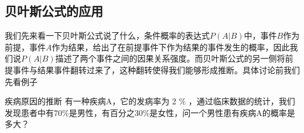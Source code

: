\subsection{贝叶斯公式的应用}
我们先来看一下贝叶斯公式说了什么，条件概率的表达式$P(A|B)$中，事件$B$作为前提，事件$A$作为结果，给出了在前提事件下作为结果的事件发生的概率，因此我们说$P(A|B)$描述了两个事件之间的因果关系强度。而贝叶斯公式的另一侧将前提事件与结果事件翻转过来了，这种翻转使得我们能够形成推断。具体讨论前我们先看例子
\begin{example}{疾病原因的推断}
有一种疾病A，它的发病率为 2 \% ，通过临床数据的统计，我们发现患者中有70\%是男性，有百分之30\%是女性，问一个男性患有疾病A的概率是多大？
\end{example}
